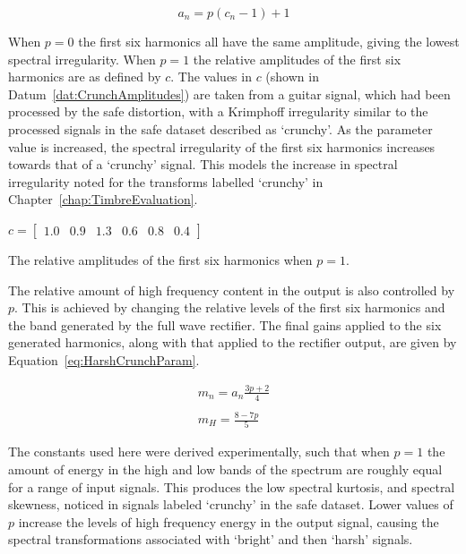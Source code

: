 			\begin{equation}
				a_{n} = p(c_{n} - 1) + 1
				\label{eq:HarshCrunchAmps}
			\end{equation}

			When $p = 0$ the first six harmonics all have the same amplitude, giving the lowest spectral
			irregularity. When $p = 1$ the relative amplitudes of the first six harmonics are as defined by
			$c$.  The values in $c$ (shown in Datum~\ref{dat:CrunchAmplitudes}) are taken from a guitar signal,
			which had been processed by the \acrshort{safe} distortion, with a Krimphoff irregularity similar
			to the processed signals in the \acrshort{safe} dataset described as `crunchy'. As the parameter
			value is increased, the spectral irregularity of the first six harmonics increases towards that of
			a `crunchy' signal.  This models the increase in spectral irregularity noted for the transforms
			labelled `crunchy' in Chapter~\ref{chap:TimbreEvaluation}.

			\begin{datum}[h!]
				\centering
				$c = \begin{bmatrix}
					1.0 & 0.9 & 1.3 & 0.6 & 0.8 & 0.4
				     \end{bmatrix}$
				\caption{The relative amplitudes of the first six harmonics when $p = 1$.}
				\label{dat:CrunchAmplitudes}
			\end{datum}
			
			The relative amount of high frequency content in the output is also controlled by $p$. This is
			achieved by changing the relative levels of the first six harmonics and the band generated by the
			full wave rectifier. The final gains applied to the six generated harmonics, along with that
			applied to the rectifier output, are given by Equation~\ref{eq:HarshCrunchParam}.

			\begin{gather}
				m_{n} = a_{n}\frac{3p + 2}{4} \nonumber \\
				\nonumber \\
				m_{H} = \frac{8 - 7p}{5}
				\label{eq:HarshCrunchParam}
			\end{gather}

			The constants used here were derived experimentally, such that when $p = 1$ the amount of energy in
			the high and low bands of the spectrum are roughly equal for a range of input signals. This
			produces the low spectral kurtosis, and spectral skewness, noticed in signals labeled `crunchy' in
			the \acrshort{safe} dataset. Lower values of $p$ increase the levels of high frequency energy in
			the output signal, causing the spectral transformations associated with `bright' and then `harsh'
			signals.

